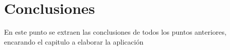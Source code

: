 \chapter{Conclusiones}

{\color{red} En este punto se extraen las conclusiones de todos los puntos anteriores, encarando el capitulo a elaborar la aplicación}